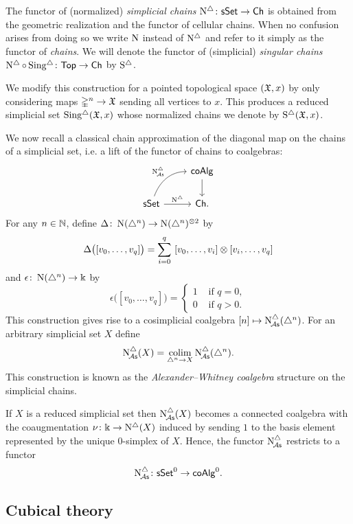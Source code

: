 The functor of (normalized) \textit{simplicial chains} $\operatorname{N^{\triangle}} \colon \mathsf{sSet} \to \mathsf{Ch}$ is obtained from the geometric realization and the functor of cellular chains.
When no confusion arises from doing so we write $\operatorname{N}$ instead of $\operatorname{N^{\triangle}}$ and refer to it simply as the functor of \textit{chains}.
We will denote the functor of (simplicial) \textit{singular chains} $\operatorname{N^{\triangle}} \circ \operatorname{Sing^{\triangle}} \colon \mathsf{Top} \to \mathsf{Ch}$ by $\operatorname{S^{\triangle}}$.

We modify this construction for a pointed topological space $(\mathfrak{X},x)$ by only considering maps $\mathbb{\Delta}^n \to \mathfrak{X}$ sending all vertices to $x$.
This produces a reduced simplicial set $\operatorname{Sing^{\triangle}}(\mathfrak{X},x)$ whose normalized chains we denote by $\operatorname{S^{\triangle}}(\mathfrak{X},x)$.

We now recall a classical chain approximation of the diagonal map on the chains of a simplicial set, i.e. a lift of the functor of chains to coalgebras:
\[
\begin{tikzcd}
	& \coAlg \arrow[d] \\
	\sSet \arrow[r, "\schains"] \arrow[ur, "\schainsA", out=70, in=180] & \Ch.
\end{tikzcd}
\]
 For any $n \in \mathbb{N}$, define $\Delta \colon \operatorname{N}(\triangle^n) \to \operatorname{N}(\triangle^n)^{\otimes2}$ by
\[
\Delta \big( [v_0, \dots, v_q] \big) = \sum_{i=0}^q \ [v_0, \dots, v_i] \otimes [v_i, \dots, v_q]
\]
and $\epsilon \colon \operatorname{N}(\triangle^n) \to \Bbbk$ by
\[
\epsilon \big( [v_0, \dots, v_q] \big) = \begin{cases} 1 & \text{ if } q = 0, \\ 0 & \text{ if } q>0. \end{cases}
\] This construction gives rise to a cosimplicial coalgebra $[n] \mapsto \operatorname{N^{\triangle}_{\!{\mathcal{A}\mathsf{s}}}}(\triangle^n)$. For an arbitrary simplicial set $X$ define 
\[
\operatorname{N^{\triangle}_{\!{\mathcal{A}\mathsf{s}}}}(X) = \operatorname*{colim}_{\triangle^n \to X} \operatorname{N^{\triangle}_{\!{\mathcal{A}\mathsf{s}}}}(\triangle^n).
\]
This construction is known as the \textit{Alexander--Whitney coalgebra} structure on the simplicial chains.

If $X$ is a reduced simplicial set then $\operatorname{N^{\triangle}_{\!{\mathcal{A}\mathsf{s}}}}(X)$ becomes a connected coalgebra with the coaugmentation $\nu \colon \Bbbk \to \operatorname{N^{\triangle}}(X)$ induced by sending $1$ to the basis element represented by the unique $0$-simplex of $X$.
Hence, the functor $\operatorname{N^{\triangle}_{\!{\mathcal{A}\mathsf{s}}}}$ restricts to a functor
\[
\operatorname{N^{\triangle}_{\!{\mathcal{A}\mathsf{s}}}} \colon \mathsf{sSet}^0 \to \mathsf{coAlg}^0.
\]

\subsection{Cubical theory}\label{ss:cubical}

